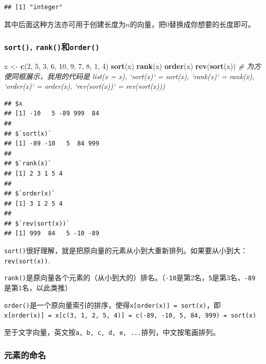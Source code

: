 \documentclass[]{book}
\newenvironment{Shaded}{\begin{snugshade}}{\end{snugshade}}
\newcommand{\CommentTok}[1]{\textcolor[rgb]{0.56,0.35,0.01}{\textit{#1}}}
\newcommand{\DecValTok}[1]{\textcolor[rgb]{0.00,0.00,0.81}{#1}}
\newcommand{\KeywordTok}[1]{\textcolor[rgb]{0.13,0.29,0.53}{\textbf{#1}}}
\newcommand{\NormalTok}[1]{#1}
\newcommand{\StringTok}[1]{\textcolor[rgb]{0.31,0.60,0.02}{#1}}
\begin{document}
\begin{verbatim}
## [1] "integer"
\end{verbatim}

其中后面这种方法亦可用于创建长度为\(n\)的向量，把0替换成你想要的长度即可。

\hypertarget{sort-rank-order}{%
\subsubsection{\texorpdfstring{\texttt{sort()}, \texttt{rank()}和\texttt{order()}}{sort(), rank()和order()}}\label{sort-rank-order}}

\begin{Shaded}
\begin{Highlighting}[]
\NormalTok{x <-}\StringTok{ }\KeywordTok{c}\NormalTok{(}\DecValTok{2}\NormalTok{, }\DecValTok{5}\NormalTok{, }\DecValTok{3}\NormalTok{, }\DecValTok{6}\NormalTok{, }\DecValTok{10}\NormalTok{, }\DecValTok{9}\NormalTok{, }\DecValTok{7}\NormalTok{, }\DecValTok{8}\NormalTok{, }\DecValTok{1}\NormalTok{, }\DecValTok{4}\NormalTok{)}
\KeywordTok{sort}\NormalTok{(x)}
\KeywordTok{rank}\NormalTok{(x)}
\KeywordTok{order}\NormalTok{(x)}
\KeywordTok{rev}\NormalTok{(}\KeywordTok{sort}\NormalTok{(x))}
\CommentTok{# 为方便同框展示，我用的代码是 list(x = x), `sort(x)` = sort(x), `rank(x)` = rank(x), `order(x)` = order(x), `rev(sort(x))` = rev(sort(x)))}
\end{Highlighting}
\end{Shaded}

\begin{verbatim}
## $x
## [1] -10   5 -89 999  84
## 
## $`sort(x)`
## [1] -89 -10   5  84 999
## 
## $`rank(x)`
## [1] 2 3 1 5 4
## 
## $`order(x)`
## [1] 3 1 2 5 4
## 
## $`rev(sort(x))`
## [1] 999  84   5 -10 -89
\end{verbatim}

\texttt{sort()}很好理解，就是把原向量的元素从小到大重新排列。如果要从小到大：\texttt{rev(sort(x))}.

\texttt{rank()}是原向量各个元素的（从小到大的）排名。（\texttt{-10}是第2名，\texttt{5}是第3名，\texttt{-89}是第1名，以此类推）

\texttt{order()}是一个原向量索引的排序，使得\texttt{x{[}order(x){]}\ =\ sort(x)}，即\texttt{x{[}order(x){]}\ =\ x{[}c(3,\ 1,\ 2,\ 5,\ 4){]}\ =\ c(-89,\ -10,\ 5,\ 84,\ 999)\ =\ sort(x)}

至于文字向量，英文按\texttt{a,\ b,\ c,\ d,\ e,\ ...}排列，中文按笔画排列。

\hypertarget{naming-elements}{%
\subsubsection{元素的命名}\label{naming-elements}}
\end{document}
